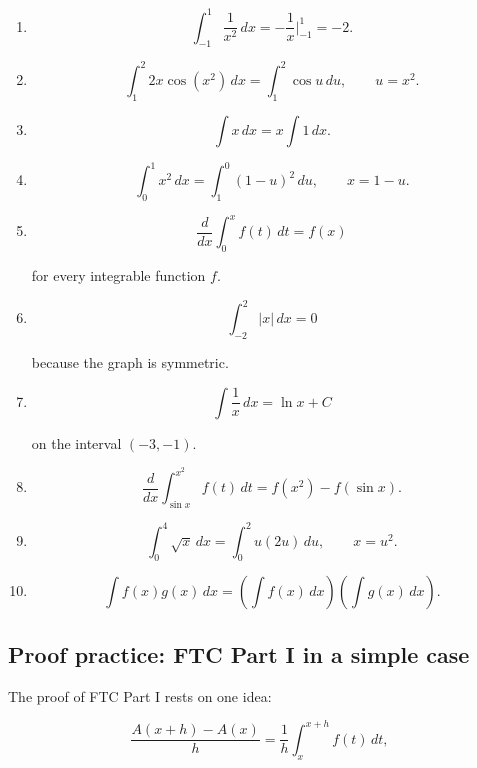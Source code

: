 \begin{enumerate}
\item

\[
\int_{-1}^{1}\frac1{x^2}\,dx
=
-\frac1x\Big|_{-1}^{1}
=
-2.
\]

\item

\[
\int_1^2 2x\cos(x^2)\,dx
=
\int_1^2 \cos u\,du,
\qquad u=x^2.
\]

\item

\[
\int x\,dx
=
x\int 1\,dx.
\]

\item

\[
\int_0^1 x^2\,dx
=
\int_1^0 (1-u)^2\,du,
\qquad x=1-u.
\]

\item

\[
\frac{d}{dx}\int_0^x f(t)\,dt=f(x)
\]

for every integrable function \(f\).

\item

\[
\int_{-2}^{2} |x|\,dx=0
\]

because the graph is symmetric.

\item

\[
\int \frac1x\,dx=\ln x+C
\]

on the interval \((-3,-1)\).

\item

\[
\frac{d}{dx}\int_{\sin x}^{x^2} f(t)\,dt
=
f(x^2)-f(\sin x).
\]

\item

\[
\int_0^4 \sqrt{x}\,dx
=
\int_0^2 u(2u)\,du,
\qquad x=u^2.
\]

\item

\[
\int f(x)g(x)\,dx
=
\left(\int f(x)\,dx\right)\left(\int g(x)\,dx\right).
\]

\end{enumerate}

\subsection{Proof practice: FTC Part I in a simple case}
\label{subsec:proof-practice-ftc1-simple-case}

The proof of FTC Part I rests on one idea:

\[
\frac{A(x+h)-A(x)}{h}
=
\frac1h\int_x^{x+h} f(t)\,dt,
\]

